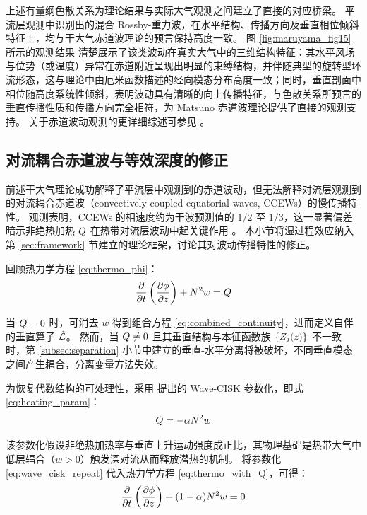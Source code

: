 上述有量纲色散关系为理论结果与实际大气观测之间建立了直接的对应桥梁。
平流层观测中识别出的混合 Rossby-重力波，在水平结构、传播方向及垂直相位倾斜特征上，均与干大气赤道波理论的预言保持高度一致。
图 \ref{fig:maruyama_fig15} 所示的观测结果 \citep{Maruyama1967} 清楚展示了该类波动在真实大气中的三维结构特征：其水平风场与位势（或温度）异常在赤道附近呈现出明显的束缚结构，并伴随典型的旋转型环流形态，这与理论中由厄米函数描述的经向模态分布高度一致；同时，垂直剖面中相位随高度系统性倾斜，表明波动具有清晰的向上传播特征，与色散关系所预言的垂直传播性质和传播方向完全相符，为 Matsuno 赤道波理论提供了直接的观测支持。
关于赤道波动观测的更详细综述可参见 \citep{kiladisConvectivelyCoupledEquatorial2009}。

\subsection{对流耦合赤道波与等效深度的修正}
\label{subsec:heating_effect}

前述干大气理论成功解释了平流层中观测到的赤道波动，但无法解释对流层观测到的对流耦合赤道波（convectively coupled equatorial waves, CCEWs）的慢传播特性。
观测表明，CCEWs 的相速度约为干波预测值的 $1/2$ 至 $1/3$，这一显著偏差暗示非绝热加热 $Q$ 在热带对流层波动中起关键作用 \citep{kiladisConvectivelyCoupledEquatorial2009}。
本小节将湿过程效应纳入第 \ref{sec:framework} 节建立的理论框架，讨论其对波动传播特性的修正。

回顾热力学方程 \eqref{eq:thermo_phi}：
\begin{equation}
    \pde{}{\timevar}\left(\pde{\gravpotential}{z}\right) + \bvfreq^2 w = \nonadheat
    \label{eq:thermo_with_Q}
\end{equation}

当 $Q = 0$ 时，可消去 $w$ 得到组合方程 \eqref{eq:combined_continuity}，进而定义自伴的垂直算子 $\hat{\mathcal{L}}$。
然而，当 $Q \neq 0$ 且其垂直结构与本征函数族 $\{Z_j(z)\}$ 不一致时，第 \ref{subsec:separation} 小节中建立的垂直-水平分离将被破坏，不同垂直模态之间产生耦合，分离变量方法失效。

为恢复代数结构的可处理性，采用 \citep{lindzenWaveCISKTropics1974} 提出的 Wave-CISK 参数化，即式 \eqref{eq:heating_param}：
\begin{equation}
    Q = -\alpha N^2 w
    \label{eq:wave_cisk_repeat}
\end{equation}

该参数化假设非绝热加热率与垂直上升运动强度成正比，其物理基础是热带大气中低层辐合（$w > 0$）触发深对流从而释放潜热的机制。
将参数化 \eqref{eq:wave_cisk_repeat} 代入热力学方程 \eqref{eq:thermo_with_Q}，可得：
\begin{equation}
    \pde{}{\timevar}\left(\pde{\gravpotential}{z}\right) + (1 - \moistparam)\bvfreq^2 w = 0
\end{equation}

